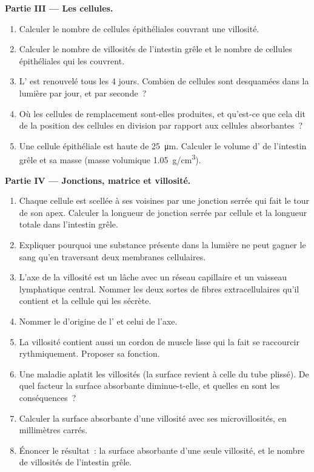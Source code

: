 \begin{problem}
\medskip
\noindent\textbf{Partie III --- Les cellules.}
\begin{enumerate}[resume]
  \item Calculer le nombre de cellules épithéliales couvrant une
        villosité.
  \item Calculer le nombre de villosités de l'intestin grêle et le
        nombre de cellules épithéliales qui les couvrent.
  \item L' est renouvelé tous les \qty{4}{} jours. Combien de
        cellules sont desquamées dans la lumière par jour, et par
        seconde~?
  \item Où les cellules de remplacement sont-elles produites, et
        qu'est-ce que cela dit de la position des cellules en division
        par rapport aux cellules absorbantes~?
  \item Une cellule épithéliale est haute de \qty{25}{\micro m}.
        Calculer le volume d' de l'intestin grêle et sa masse
        (masse volumique \qty{1.05}{g/cm^3}).
\end{enumerate}

\medskip
\noindent\textbf{Partie IV --- Jonctions, matrice et villosité.}
\begin{enumerate}[resume]
  \item Chaque cellule est scellée à ses voisines par une jonction
        serrée qui fait le tour de son apex. Calculer la longueur de
        jonction serrée par cellule et la longueur totale dans
        l'intestin grêle.
  \item Expliquer pourquoi une substance présente dans la lumière ne
        peut gagner le sang qu'en traversant deux membranes cellulaires.
  \item L'axe de la villosité est un  lâche avec un
        réseau capillaire et un vaisseau lymphatique central. Nommer les
        deux sortes de fibres extracellulaires qu'il contient et la
        cellule qui les sécrète.
  \item Nommer le  d'origine de l' et
        celui de l'axe.
  \item La villosité contient aussi un cordon de muscle lisse qui la
        fait se raccourcir rythmiquement. Proposer sa fonction.
  \item Une maladie aplatit les villosités (la surface revient à celle
        du tube plissé). De quel facteur la surface absorbante
        diminue-t-elle, et quelles en sont les conséquences~?
  \item Calculer la surface absorbante d'une villosité avec ses
        microvillosités, en millimètres carrés.
  \item Énoncer le résultat~: la surface absorbante d'une seule
        villosité, et le nombre de villosités de l'intestin grêle.
\end{enumerate}
\end{problem}
